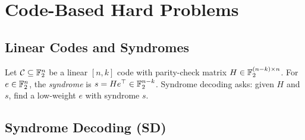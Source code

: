 \chapter{Code-Based Hard Problems}

\section{Linear Codes and Syndromes}
Let $\mathcal{C}\subseteq \mathbb{F}_2^n$ be a linear $[n,k]$ code with parity-check matrix $H\in\mathbb{F}_2^{(n-k)\times n}$.
For $e\in\mathbb{F}_2^n$, the \emph{syndrome} is $s = He^\top\in\mathbb{F}_2^{n-k}$.
Syndrome decoding asks: given $H$ and $s$, find a low-weight $e$ with syndrome $s$.

\section{Syndrome Decoding (SD)}

